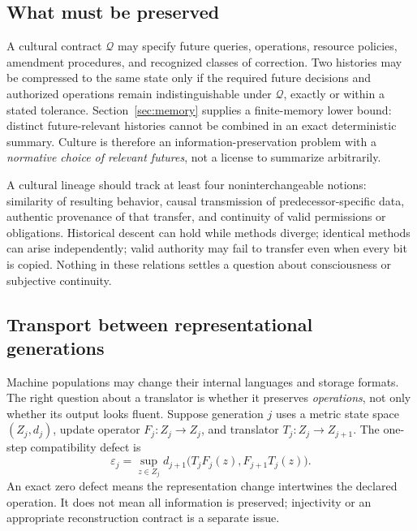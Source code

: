 \documentclass[11pt,letterpaper]{article}
\theoremstyle{plain}
\theoremstyle{definition}
\theoremstyle{remark}
\begin{document}
\subsection{What must be preserved}

A cultural contract $\mathcal Q$ may specify future queries, operations, resource policies, amendment procedures, and recognized classes of correction. Two histories may be compressed to the same state only if the required future decisions and authorized operations remain indistinguishable under $\mathcal Q$, exactly or within a stated tolerance. Section~\ref{sec:memory} supplies a finite-memory lower bound: distinct future-relevant histories cannot be combined in an exact deterministic summary. Culture is therefore an information-preservation problem with a \emph{normative choice of relevant futures}, not a license to summarize arbitrarily.

A cultural lineage should track at least four noninterchangeable notions: similarity of resulting behavior, causal transmission of predecessor-specific data, authentic provenance of that transfer, and continuity of valid permissions or obligations. Historical descent can hold while methods diverge; identical methods can arise independently; valid authority may fail to transfer even when every bit is copied. Nothing in these relations settles a question about consciousness or subjective continuity.

\subsection{Transport between representational generations}

Machine populations may change their internal languages and storage formats. The right question about a translator is whether it preserves \emph{operations}, not only whether its output looks fluent. Suppose generation $j$ uses a metric state space $(Z_j,d_j)$, update operator $F_j:Z_j\to Z_j$, and translator $T_j:Z_j\to Z_{j+1}$. The one-step compatibility defect is
\begin{equation}\label{eq:transport-defect}
\varepsilon_j=\sup_{z\in Z_j}d_{j+1}\bigl(T_jF_j(z),F_{j+1}T_j(z)\bigr).
\end{equation}
An exact zero defect means the representation change intertwines the declared operation. It does not mean all information is preserved; injectivity or an appropriate reconstruction contract is a separate issue.
\end{document}

